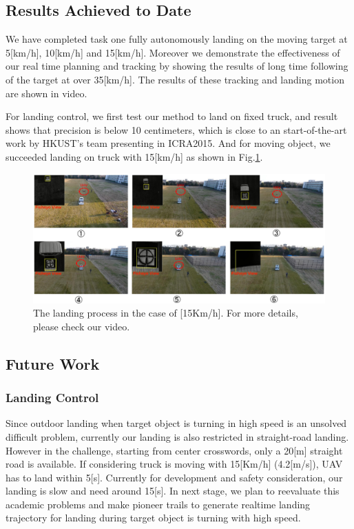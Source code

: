 \documentclass{standalone}
\begin{document}
\subsection{Results Achieved to Date}

We have completed task one fully autonomously landing on the moving
target at 5[km/h], 10[km/h] and 15[km/h]. Moreover we demonstrate the effectiveness of our real time planning and tracking by showing the results of long time
following of the target at over 35[km/h]. The results of these tracking and landing motion are shown in video.

For landing control, we first test our method to land on fixed truck, and result shows that precision is below 10 centimeters, which is close to an start-of-the-art work by HKUST's team presenting in ICRA2015. And for moving object, we succeeded landing on truck with 15[km/h] as shown in Fig.\ref{figure:landing}.

\begin{figure}[h]
    \begin{center}
      \includegraphics[clip, bb= 0 0 720 315, width=1.0\columnwidth]{sections/task1/images/task1_landing.eps}
    \end{center}
    \caption{The landing process in the case of [15Km/h]. For more details, please check our video.}
    \label{figure:landing}
\end{figure}


\subsection{Future Work}
\subsubsection{Landing Control}
Since outdoor landing when target object is turning in high speed is an unsolved difficult problem, currently our landing is also restricted in straight-road landing. However in the challenge, starting from center crosswords, only a 20[m] straight road is available. If considering truck is moving with 15[Km/h] (4.2[m/s]), UAV has to land within 5[s]. Currently for development and safety consideration, our landing is slow and need around 15[s].
In next stage, we plan to reevaluate this academic problems and make pioneer trails to generate realtime landing trajectory for landing during target object is turning with high speed.
\end{document}
